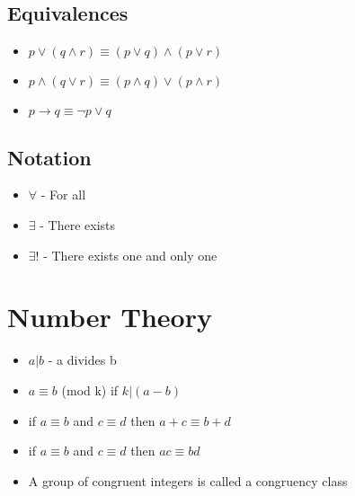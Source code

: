 \documentclass{article}
\begin{document}
\subsection*{Equivalences}
\begin{itemize}
\item $p \lor (q \land r) \equiv (p \lor q) \land (p \lor r)$
\item $p \land (q \lor r) \equiv (p \land q) \lor (p \land r)$
\item $p \rightarrow q \equiv \neg p \lor q$
\end{itemize}

\subsection*{Notation}
\begin{itemize}
\item $\forall$ - For all
\item $\exists$ - There exists
\item $\exists!$ - There exists one and only one
\end{itemize}

\section*{Number Theory}
\begin{itemize}
\item $a | b$ - a divides b 
\item $a \equiv b$ (mod k) if $k | (a-b)$ 
\item if $a \equiv b$ and $c \equiv d$ then $a + c \equiv b + d$ 
\item if $a \equiv b$ and $c \equiv d$ then $ac \equiv bd$ 
\item A group of congruent integers is called a congruency class
\end{itemize}
\end{document}
